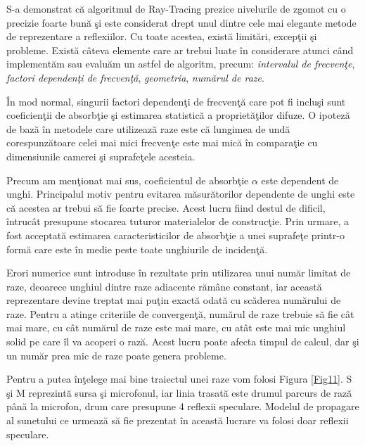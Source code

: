 	S-a demonstrat c\u{a} algoritmul de Ray-Tracing prezice nivelurile de zgomot cu o precizie foarte bun\u{a} \c{s}i este considerat drept unul dintre cele mai elegante metode de reprezentare a reflexiilor. Cu toate acestea, exist\u{a} limit\u{a}ri, excep\c{t}ii \c{s}i probleme. Exist\u{a} c\^{a}teva elemente care ar trebui luate \^{i}n considerare atunci c\^{a}nd implement\u{a}m sau evalu\u{a}m un astfel de algoritm, precum: \textit{intervalul de frecven\c{t}e}, \textit{factori dependen\c{t}i de frecven\c{t}\u{a}}, \textit{geometria}, \textit{num\u{a}rul de raze}.
	 
	
	\^{I}n mod normal, singurii factori dependen\c{t}i de frecven\c{t}\u{a} care pot fi inclu\c{s}i sunt coeficien\c{t}ii de absorb\c{t}ie \c{s}i estimarea statistic\u{a} a propriet\u{a}\c{t}ilor difuze. O ipotez\u{a} de baz\u{a} \^{i}n metodele care utilizeaz\u{a} raze este c\u{a} lungimea de und\u{a} corespunz\u{a}toare celei mai mici frecven\c{t}e este mai mic\u{a} \^{i}n compara\c{t}ie cu dimensiunile camerei \c{s}i suprafe\c{t}ele acesteia.
	 
	
	Precum am men\c{t}ionat mai sus, coeficientul de absorb\c{t}ie $\alpha$ este dependent de unghi. Principalul motiv pentru evitarea m\u{a}sur\u{a}torilor dependente de unghi este c\u{a} acestea ar trebui s\u{a} fie foarte precise. Acest lucru fiind destul de dificil, \^{i}ntruc\^{a}t presupune stocarea tuturor materialelor de construc\c{t}ie. Prin urmare, a fost acceptat\u{a} estimarea caracteristicilor de absorb\c{t}ie a unei suprafe\c{t}e printr-o form\u{a} care este \^{i}n medie peste toate unghiurile de inciden\c{t}\u{a}.
	 
	
	Erori numerice sunt introduse \^{i}n rezultate prin utilizarea unui num\u{a}r limitat de raze, deoarece unghiul dintre raze adiacente r\u{a}m\^{a}ne constant, iar aceast\u{a} reprezentare devine treptat mai pu\c{t}in exact\u{a} odat\u{a} cu sc\u{a}derea num\u{a}rului de raze. Pentru a atinge criteriile de convergen\c{t}\u{a}, num\u{a}rul de raze trebuie s\u{a} fie c\^{a}t mai mare, cu c\^{a}t num\u{a}rul de raze este mai mare, cu at\^{a}t este mai mic unghiul solid pe care \^{i}l va acoperi o raz\u{a}. Acest lucru poate afecta timpul de calcul, dar \c{s}i un num\u{a}r prea mic de raze poate genera probleme. 
	 
	
	Pentru a putea \^{i}n\c{t}elege mai bine traiectul unei raze vom folosi Figura \ref{Fig11}. S \c{s}i M reprezint\u{a} sursa \c{s}i microfonul, iar linia trasat\u{a} este drumul parcurs de raz\u{a} p\^{a}n\u{a} la microfon, drum care presupune 4 reflexii speculare. Modelul de propagare al sunetului ce urmeaz\u{a} s\u{a} fie prezentat \^{i}n aceast\u{a} lucrare va folosi doar reflexii speculare.
	 
